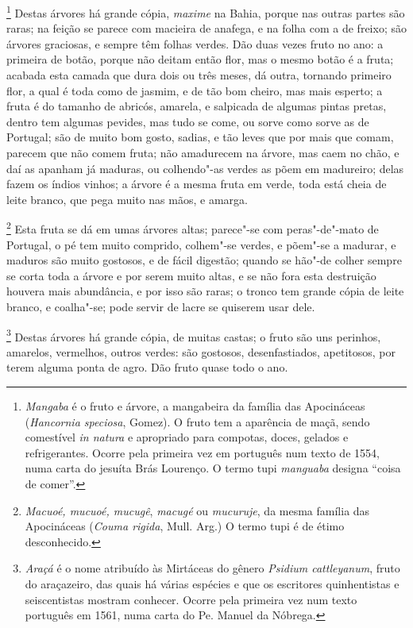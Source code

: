 \begin{linenumbers}
\footnote{ \textit{Mangaba} é o fruto e árvore, a
mangabeira da família das Apocináceas (\textit{Hancornia speciosa}, 
Gomez). O fruto tem a aparência de maçã, sendo comestível \textit{in
natura} e apropriado para compotas, doces, gelados e refrigerantes.
Ocorre pela primeira vez em português num texto de 1554, numa
carta do jesuíta Brás Lourenço. O termo tupi \textit{manguaba}
designa ``coisa de comer''.} Destas árvores há grande cópia, 
\textit{maxime} na Bahia, porque nas outras partes são raras; na feição se
parece com macieira de anafega, e na folha com a de freixo; são árvores
graciosas, e sempre têm folhas verdes. Dão duas vezes fruto no ano: a
primeira de botão, porque não deitam então flor, mas o mesmo botão é a
fruta; acabada esta camada que dura dois ou três meses, dá outra,
tornando primeiro flor, a qual é toda como de jasmim, e de tão bom
cheiro, mas mais esperto; a fruta é do tamanho de abricós, amarela, e
salpicada de algumas pintas pretas, dentro tem algumas pevides, mas
tudo se come, ou sorve como sorve as de Portugal; são de muito bom
gosto, sadias, e tão leves que por mais que comam, parecem que não
comem fruta; não amadurecem na árvore, mas caem no chão, e daí as
apanham já maduras, ou colhendo"-as verdes as põem em madureiro; delas
fazem os índios vinhos; a árvore é a mesma fruta em verde, toda está
cheia de leite branco, que pega muito nas mãos, e amarga.

\footnote{ \textit{Macuoé, mucuoé, mucugê}, 
\textit{macugé} ou \textit{mucuruje}, da mesma família das Apocináceas
(\textit{Couma rigida}, Mull. Arg.) O termo tupi é de étimo
desconhecido.} Esta fruta se dá em umas árvores
altas; parece"-se com peras"-de"-mato de Portugal, o pé tem muito
comprido, colhem"-se verdes, e põem"-se a madurar, e maduros são muito
gostosos, e de fácil digestão; quando se hão"-de colher sempre se corta
toda a árvore e por serem muito altas, e se não fora esta destruição
houvera mais abundância, e por isso são raras; o tronco tem grande
cópia de leite branco, e coalha"-se; pode servir de lacre se quiserem
usar dele.

\footnote{ \textit{Araçá} é o nome atribuído às
Mirtáceas do gênero \textit{Psidium cattleyanum}, fruto do
araçazeiro, das quais há várias espécies e que os escritores
quinhentistas e seiscentistas mostram conhecer. Ocorre pela primeira
vez num texto português em 1561, numa carta do Pe. Manuel da
Nóbrega.} Destas árvores há grande cópia, de muitas
castas; o fruto são uns perinhos, amarelos, vermelhos, outros verdes:
são gostosos, desenfastiados, apetitosos, por terem alguma ponta de
agro. Dão fruto quase todo o ano.


\end{linenumbers}
